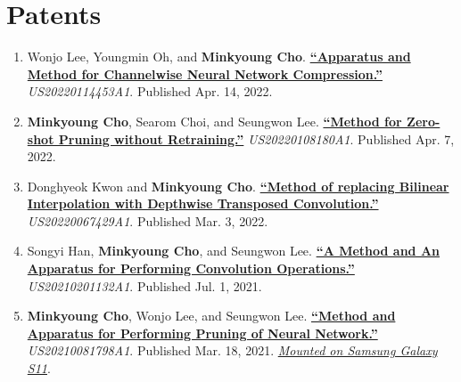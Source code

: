 \documentclass[letterpaper,oneside,11pt]{article}
\begin{document}
\section{Patents}
\begin{enumerate}[leftmargin=*, itemsep=0em]
  \item \small Wonjo Lee, Youngmin Oh, and \textbf{Minkyoung Cho}. \textbf{\href{https://patentimages.storage.googleapis.com/82/b3/b5/3652b77fd7fe2a/US20220114453A1.pdf}{``Apparatus and Method for Channelwise Neural Network Compression.''}} \textit{US20220114453A1}. Published Apr. 14, 2022.
  \item \small \textbf{Minkyoung Cho}, Searom Choi, and Seungwon Lee. \textbf{\href{https://patentimages.storage.googleapis.com/2a/76/c3/1436cb6d759f01/US20220108180A1.pdf}{``Method for Zero-shot Pruning without Retraining.''}} \textit{US20220108180A1}. Published Apr. 7, 2022.
  \item \small Donghyeok Kwon and \textbf{Minkyoung Cho}. \textbf{\href{https://patentimages.storage.googleapis.com/65/93/b5/0087b1b6fdf1bd/US20220067429A1.pdf}{``Method of replacing Bilinear Interpolation with Depthwise Transposed Convolution.''}} \textit{US20220067429A1}. Published Mar. 3, 2022.
  \item \small Songyi Han, \textbf{Minkyoung Cho}, and Seungwon Lee. \textbf{\href{https://patentimages.storage.googleapis.com/d4/9e/74/0f46f5127f65e5/US20210201132A1.pdf}{``A Method and An Apparatus for Performing Convolution Operations.''}} \textit{US20210201132A1}. Published Jul. 1, 2021.
  \item \small \textbf{Minkyoung Cho}, Wonjo Lee, and Seungwon Lee. \textbf{\href{https://patentimages.storage.googleapis.com/c1/cb/54/45c128411b5489/US20210081798A1.pdf}{``Method and Apparatus for Performing Pruning of Neural Network.''}} \textit{US20210081798A1}. Published Mar. 18, 2021. \underline{\textsl{Mounted on Samsung Galaxy S11}}.   
\end{enumerate}
  
\end{document}
